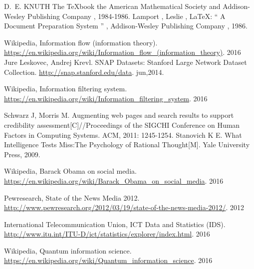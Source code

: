 \documentclass[a4paper,11pt]{article}
\begin{document}
\newpage%
\thispagestyle{empty}%
\begin{thebibliography}{}
%
%
 D.~E. KNUTH   The \TeX{}book  the American
Mathematical Society and Addison-Wesley
Publishing Company  ,  1984-1986.
Lamport ,  Leslie ,   \LaTeX{}: `` A Document Preparation System '' , 
Addison-Wesley Publishing Company ,  1986.

Wikipedia, Information flow (information theory). \url{https://en.wikipedia.org/wiki/Information_flow_(information_theory)}. 2016
Jure Leskovec, Andrej Krevl. {SNAP Datasets}: {Stanford} Large Network Dataset Collection. \url{http://snap.stanford.edu/data}. jun,2014.

Wikipedia, Information filtering system. \url{https://en.wikipedia.org/wiki/Information_filtering_system}. 2016

Schwarz J, Morris M. Augmenting web pages and search results to support credibility assessment[C]//Proceedings of the SIGCHI Conference on Human Factors in Computing Systems. ACM, 2011: 1245-1254.
Stanovich K E. What Intelligence Tests Miss:The Psychology of Rational Thought[M]. Yale University Press, 2009.

Wikipedia, Barack Obama on social media. \url{https://en.wikipedia.org/wiki/Barack_Obama_on_social_media}. 2016


Pewresearch, State of the News Media 2012. \url{http://www.pewresearch.org/2012/03/19/state-of-the-news-media-2012/}. 2012

International Telecommunication Union, ICT Data and Statistics (IDS). \url{http://www.itu.int/ITU-D/ict/statistics/explorer/index.html}. 2016

Wikipedia, Quantum information science. \url{https://en.wikipedia.org/wiki/Quantum_information_science}. 2016
\end{thebibliography}
\end{document}
